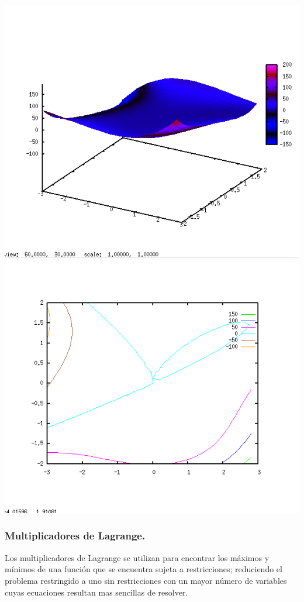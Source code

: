 \documentclass[12pt]{article}
\begin{document}
   \includegraphics[scale=0.4]{actividad82.png}
   \includegraphics[scale=0.4]{actividad83.png}
   \pagebreak
   \subsubsection*{Multiplicadores de Lagrange.}
   
   Los multiplicadores de Lagrange se utilizan para encontrar los máximos y mínimos de una función que se encuentra sujeta a restricciones; reduciendo el problema restringido a uno sin restricciones con un mayor número de variables cuyas ecuaciones resultan mas sencillas de resolver.\\
   
\end{document}
